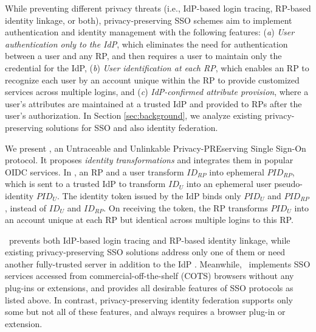 While preventing different privacy threats (i.e., IdP-based login tracing, RP-based identity linkage, or both),
privacy-preserving SSO schemes \cite{maler2008venn, NIST2017draft, BrowserID, SPRESSO,miso,POIDC} aim to implement authentication and identity management with the following features:
(\emph{a}) \emph{User authentication only to the IdP},
which eliminates the need for authentication between a user and any RP,
 and then requires a user to maintain only the credential for the IdP,
(\emph{b}) \emph{User identification at each RP}, which enables an RP to recognize each user by an account unique within the RP to provide customized services across multiple logins,
and (\emph{c}) \emph{IdP-confirmed attribute provision},
 where a user's attributes are maintained at a trusted IdP and provided to RPs after the user's authorization.
In Section \ref{sec:background}, we analyze existing privacy-preserving solutions for SSO and also identity federation.


We present \usso, an Untraceable and Unlinkable Privacy-PREserving Single Sign-On protocol.
It proposes {\em identity transformations} and integrates them in popular OIDC services.
In \usso, an RP and a user transform $ID_{RP}$ into ephemeral $PID_{RP}$, which is sent to a trusted IdP to transform $ID_U$ into an ephemeral user pseudo-identity $PID_U$.
The identity token issued by the IdP binds only $PID_U$ and $PID_{RP}$, instead of $ID_U$ and $ID_{RP}$. On receiving the token, %
 the RP transforms $PID_U$ into an account unique at each RP but identical across multiple logins to this RP.


\usso\ prevents both IdP-based login tracing and RP-based identity linkage, while existing privacy-preserving SSO solutions address only one of them \cite{BrowserID, SPRESSO, NIST2017draft, save-flow,POIDC} or need another fully-trusted server in addition to the IdP \cite{miso}.
Meanwhile, \usso\ implements SSO services
 accessed from commercial-off-the-shelf (COTS) browsers without any plug-ins or extensions,
 and provides all desirable features of SSO protocols as listed above.
In contrast, privacy-preserving identity federation \cite{PseudoID, ELPASSO, UnlimitID, Opaak, uprov, hyperledge-idemix} supports only some but not all of these features,
    and always requires a browser plug-in or extension.

